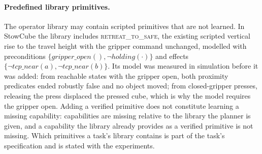 \paragraph{Predefined library primitives.}
The operator library may contain scripted primitives that are not learned. In StowCube
the library includes \textsc{retreat\_to\_safe}, the existing scripted vertical rise to
the travel height with the gripper command unchanged, modelled with preconditions
$\{\mathit{gripper\_open}(),\neg\mathit{holding}(\cdot)\}$ and effects
$\{\neg\mathit{tcp\_near}(a),\neg\mathit{tcp\_near}(b)\}$. Its model was measured in
simulation before it was added: from reachable states with the gripper open, both
proximity predicates ended robustly false and no object moved; from closed-gripper
presses, releasing the press displaced the pressed cube, which is why the model requires
the gripper open. Adding a verified primitive does not constitute learning a missing
capability: capabilities are missing relative to the library the planner is given, and a
capability the library already provides as a verified primitive is not missing. Which
primitives a task's library contains is part of the task's specification and is stated
with the experiments.
